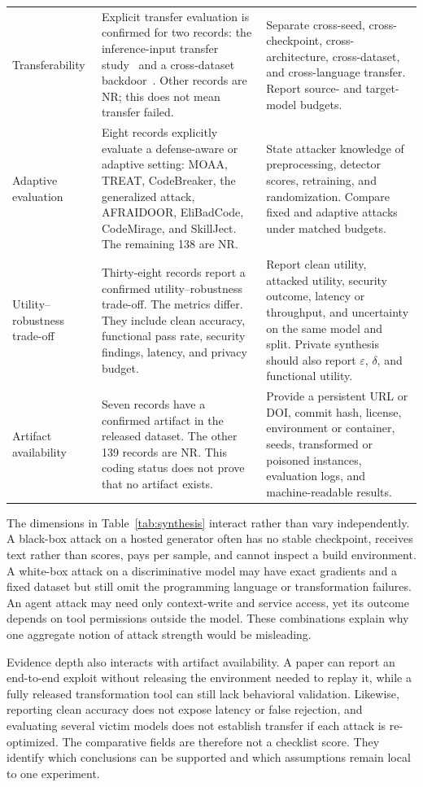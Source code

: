 \documentclass[acmsmall,screen,review]{acmart}
\begin{document}
{\begin{longtable}{@{}L{2.10cm} L{5.65cm} L{5.65cm}@{}}
Transferability & Explicit transfer evaluation is confirmed for two records: the inference-input transfer study~\cite{transfer2024coding} and a cross-dataset backdoor~\cite{transferable2026backdoor}. Other records are \textsf{NR}; this does not mean transfer failed. & Separate cross-seed, cross-checkpoint, cross-architecture, cross-dataset, and cross-language transfer. Report source- and target-model budgets. \\
Adaptive evaluation & Eight records explicitly evaluate a defense-aware or adaptive setting: MOAA, TREAT, CodeBreaker, the generalized attack, AFRAIDOOR, EliBadCode, CodeMirage, and SkillJect. The remaining 138 are \textsf{NR}. & State attacker knowledge of preprocessing, detector scores, retraining, and randomization. Compare fixed and adaptive attacks under matched budgets. \\
Utility--robustness trade-off & Thirty-eight records report a confirmed utility--robustness trade-off. The metrics differ. They include clean accuracy, functional pass rate, security findings, latency, and privacy budget. & Report clean utility, attacked utility, security outcome, latency or throughput, and uncertainty on the same model and split. Private synthesis should also report $\varepsilon$, $\delta$, and functional utility. \\
Artifact availability & Seven records have a confirmed artifact in the released dataset. The other 139 records are \textsf{NR}. This coding status does not prove that no artifact exists. & Provide a persistent URL or DOI, commit hash, license, environment or container, seeds, transformed or poisoned instances, evaluation logs, and machine-readable results. \\
\end{longtable}
}

The dimensions in Table~\ref{tab:synthesis} interact rather than vary independently. A black-box attack on a hosted generator often has no stable checkpoint, receives text rather than scores, pays per sample, and cannot inspect a build environment. A white-box attack on a discriminative model may have exact gradients and a fixed dataset but still omit the programming language or transformation failures. An agent attack may need only context-write and service access, yet its outcome depends on tool permissions outside the model. These combinations explain why one aggregate notion of attack strength would be misleading.

Evidence depth also interacts with artifact availability. A paper can report an end-to-end exploit without releasing the environment needed to replay it, while a fully released transformation tool can still lack behavioral validation. Likewise, reporting clean accuracy does not expose latency or false rejection, and evaluating several victim models does not establish transfer if each attack is re-optimized. The comparative fields are therefore not a checklist score. They identify which conclusions can be supported and which assumptions remain local to one experiment.
\end{document}

